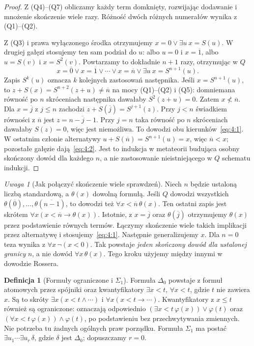 \documentclass[11pt,a4paper]{article}
\numberwithin{equation}{section}
\theoremstyle{plain}
\theoremstyle{definition}
\newtheorem{definicja}[twierdzenie]{Definicja}
\theoremstyle{remark}
\newtheorem{uwaga}[twierdzenie]{Uwaga}
\begin{document}
\begin{proof}
Z (Q4)--(Q7) obliczamy każdy term domknięty, rozwijając dodawanie i mnożenie skończenie wiele razy. Różność dwóch różnych numerałów wynika z (Q1)--(Q2).

Z (Q3) i prawa wyłączonego środka otrzymujemy $x=0\lor\exists u\ x=S(u)$. W drugiej gałęzi stosujemy ten sam podział do $u$: albo $u=0$ i $x=\overline1$, albo $u=S(v)$ i $x=S^2(v)$. Powtarzamy to dokładnie $n+1$ razy, otrzymując w $Q$
\[
x=\overline0\lor x=\overline1\lor\cdots\lor x=\overline n\lor\exists u\ x=S^{n+1}(u).
\]
Zapis $S^k(u)$ oznacza $k$ kolejnych zastosowań następnika. Jeśli $x=S^{n+1}(u)$, to $z+S(x)=S^{n+2}(z+u)\ne\overline n$ na mocy (Q1)--(Q2) i (Q5): domniemana równość po $n$ skróceniach następnika dawałaby $S^2(z+u)=0$. Zatem $x\not<\overline n$. Dla $x=\overline j$ z $j\le n$ zachodzi $z+S(\overline j)=S^{j+1}(z)$. Przy $j<n$ świadkiem równości z $\overline n$ jest $z=\overline{n-j-1}$. Przy $j=n$ taka równość po $n$ skróceniach dawałaby $S(z)=0$, więc jest niemożliwa. To dowodzi obu kierunków~\eqref{eq:4:1}. W ostatnim członie alternatywy $u+S(\overline n)=S^{n+1}(u)=x$, więc $\overline n<x$; pozostałe gałęzie dają~\eqref{eq:4:2}. Jest to indukcja w metateorii budująca osobny skończony dowód dla każdego $n$, a nie zastosowanie nieistniejącego w $Q$ schematu indukcji.
\end{proof}

\begin{uwaga}[Jak połączyć skończenie wiele sprawdzeń]\label{res:4:5}
Niech $n$ będzie ustaloną liczbą standardową, a $\theta(x)$ dowolną formułą. Jeśli $Q$ dowodzi wszystkich $\theta(\overline0),\ldots,\theta(\overline{n-1})$, to dowodzi też $\forall x<\overline n\,\theta(x)$. Ten ostatni zapis jest skrótem $\forall x(x<\overline n\to\theta(x))$. Istotnie, z $x=\overline j$ oraz $\theta(\overline j)$ otrzymujemy $\theta(x)$ przez podstawienie równych termów. Łączymy skończenie wiele takich implikacji przez alternatywę i stosujemy~\eqref{eq:4:1}. Następnie generalizujemy $x$. Dla $n=0$ teza wynika z $\forall x\,\neg(x<0)$. Tak powstaje \emph{jeden skończony dowód dla ustalonej granicy} $n$, a nie dowód $\forall x\,\theta(x)$. Tego kroku użyjemy między innymi w dowodzie Rossera.
\end{uwaga}

\begin{definicja}[Formuły ograniczone i $\Sigma_1$]\label{res:4:6}
Formuła $\Delta_0$ powstaje z formuł atomowych przez spójniki oraz kwantyfikatory $\exists x<t$, $\forall x<t$, gdzie $t$ nie zawiera $x$. Są to skróty $\exists x(x<t\land\cdots)$ i $\forall x(x<t\to\cdots)$. Kwantyfikatory z $x\le t$ również są ograniczone: oznaczają odpowiednio $(\exists x<t\,\varphi(x))\lor\varphi(t)$ oraz $(\forall x<t\,\varphi(x))\land\varphi(t)$, po podstawieniu bez przechwytywania zmiennych. Nie potrzeba tu żadnych ogólnych praw porządku. Formuła $\Sigma_1$ ma postać $\exists u_1\cdots\exists u_r\,\delta$, gdzie $\delta$ jest $\Delta_0$; dopuszczamy $r=0$.
\end{definicja}
\end{document}
